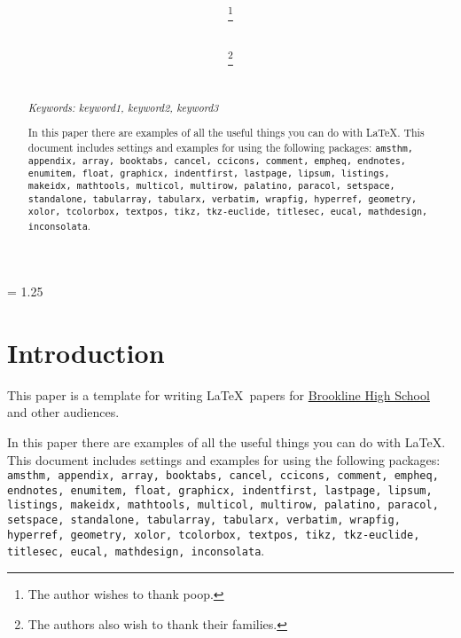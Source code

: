 \documentclass[11pt]{article}%
\title{{\bf \doctitle}}%
\author{\docauthortwo \thanks{The author wishes to thank poop.} \\ \docorgtwo \\ \small{\lemail{\docemailtwo}}
 \and%
 \docauthor \thanks{The authors also wish to thank their families.} \\ \docorg \\ \small{\lemail{\docemail}}}%
\date{} %
\begin{document}
\maketitle

\begin{multicols*}{2}
\begin{abstract}


{\em Keywords: keyword1, keyword2, keyword3 %

In this paper there are examples of all the useful things you can do
with \LaTeX. This document includes settings and examples for using
the following packages: {\tt amsthm, appendix, array, booktabs, cancel, ccicons, comment, empheq, endnotes, enumitem, float, graphicx, indentfirst, lastpage, lipsum, listings, makeidx, mathtools, multicol, multirow, palatino, paracol, setspace, standalone, tabularray, tabularx, verbatim, wrapfig, hyperref, geometry, xolor, tcolorbox, textpos, tikz, tkz-euclide, titlesec, eucal, mathdesign, inconsolata}.

}

\end{abstract}


\baselineskip = 1.25\baselineskip %

\section{Introduction}
\label{Introduction}

This paper is a template for writing \LaTeX\ papers for
\href{http://j.mp/psb_david_petty}{Brookline High School} and other
audiences.


In this paper there are examples of all the useful things you can do
with \LaTeX. This document includes settings and examples for using
the following packages: {\tt amsthm, appendix, array, booktabs, cancel, ccicons, comment, empheq, endnotes, enumitem, float, graphicx, indentfirst, lastpage, lipsum, listings, makeidx, mathtools, multicol, multirow, palatino, paracol, setspace, standalone, tabularray, tabularx, verbatim, wrapfig, hyperref, geometry, xolor, tcolorbox, textpos, tikz, tkz-euclide, titlesec, eucal, mathdesign, inconsolata}.


\end{multicols*}
\end{document}
